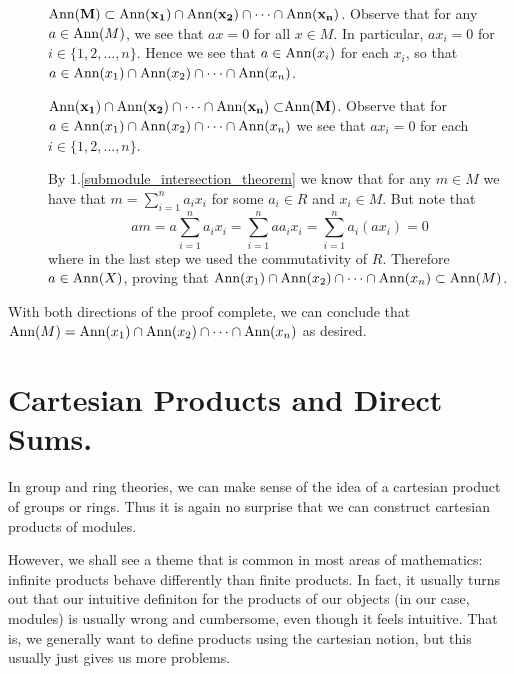 \begin{prf}
    \begin{description}
        \item[\phantom{m}]$\bf{\mbox{Ann}(M) \subset \mbox{Ann}(x_1) \cap \mbox{Ann}(x_2) \cap \dots \cap \mbox{Ann}(x_n)}$.
        Observe that for any $a \in \mbox{Ann}(M)$, we see that $ax = 0$
        for all $x \in M$. In particular, $ax_i = 0$ for $i \in
        \{1, 2, \dots, n\}$. Hence we see that $a \in \mbox{Ann}(x_i)$
        for each $x_i$, so that $a \in \mbox{Ann}(x_1) \cap \mbox{Ann}(x_2)
        \cap \dots \cap \mbox{Ann}(x_n)$.
        
        \item[\phantom{m}]$\bf{\mbox{Ann}(x_1) \cap \mbox{Ann}(x_2) \cap \dots
        \cap \mbox{Ann}(x_n) \subset }\bf{\mbox{Ann}(M)}$. Observe that for $
        a \in \mbox{Ann}(x_1) \cap \mbox{Ann}(x_2) \cap \dots \cap \mbox{Ann}(x_n)$
        we see that $ax_i = 0$ for each $i \in \{1, 2, \dots,
        n\}$.
            
        By 1.\ref{submodule_intersection_theorem} we know that for
        any $m \in M$ we have that $\displaystyle m = \sum_{i =
        1}^{n}a_ix_i$ for some $a_i \in R$ and $x_i \in M$. But
        note that 
        \[
            am = a\sum_{i =1}^{n}a_ix_i = \sum_{i =1}^{n}aa_ix_i = \sum_{i =1}^{n}a_i(ax_i) =0
        \]
        where in the last step we used the commutativity of $R$.
        Therefore $a \in \mbox{Ann}(X)$, proving that $\mbox{Ann}(x_1) \cap \mbox{Ann}(x_2) \cap \dots
        \cap \mbox{Ann}(x_n) \subset \mbox{Ann}(M)$.
    \end{description}
    With both directions of the proof complete, we can conclude
    that 
    $\mbox{Ann}(M) = \mbox{Ann}(x_1) \cap \mbox{Ann}(x_2) \cap \dots \cap
    \mbox{Ann}(x_n)$ as desired.
\end{prf}

\newpage
\section{Cartesian Products and Direct Sums. }

In group and ring theories, we can make sense of the idea of a
cartesian product of groups or rings. Thus it is again no surprise
that we can construct cartesian products of modules. 

However, we shall see a theme that is common in most areas of
mathematics: infinite products behave differently than finite
products. In fact, it usually turns out that our intuitive
definiton for the products of our objects (in our case, modules)
is usually wrong and cumbersome, even though it feels intuitive. 
That is, we generally want to define products using the cartesian
notion, but this usually just gives us more problems. 

